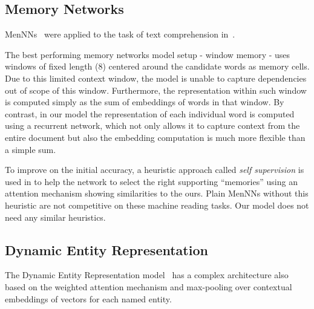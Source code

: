 \documentclass[11pt]{article}
\newcommand{\MARTIN}[1]{{\color{black}#1}}
\newcommand{\RUDAA}[1]{{\color{black}#1}}
\begin{document}
\MARTIN{
\subsection{Memory Networks}
\Glspl{MenNN}~\cite{weston2014memory} were applied to the task of text comprehension in~\cite{hill2015goldilocks}.


The best performing memory networks model setup - window memory - uses windows of fixed length (8) centered around the candidate words as memory cells.
Due to this limited context window, the model is unable to capture dependencies out of scope of this window.
Furthermore, the representation within such window is computed simply as the sum of embeddings of words in that window.
By contrast, in our model the representation of each individual word is computed using a recurrent network, which not only allows it to capture context from the entire document but also the embedding computation is much more flexible than a simple sum.

To improve on the initial accuracy, a heuristic approach called \textit{self supervision} is used in \cite{hill2015goldilocks} to help the network to select the right supporting ``memories'' using an attention mechanism showing similarities to the ours.
Plain \glspl{MenNN} without this heuristic are not competitive on these machine reading tasks. Our model does not need any similar heuristics.



\RUDAA{
\subsection{Dynamic Entity Representation}
The Dynamic Entity Representation model~\cite{Kobayashi2016} has a complex architecture also based on the weighted attention mechanism and max-pooling over contextual embeddings of vectors for each named entity. %



}


}
\end{document}
